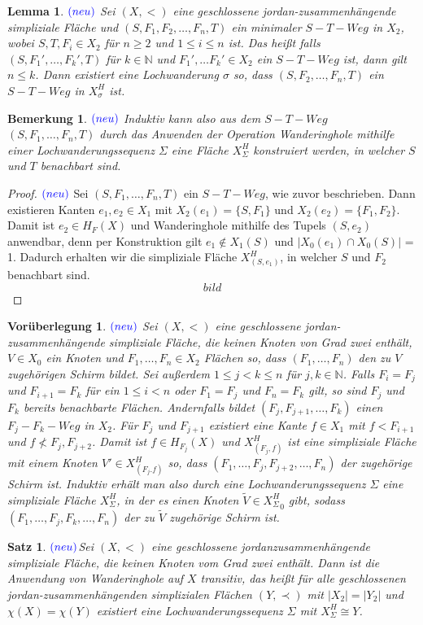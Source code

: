 \documentclass[12pt,titlepage]{article}
\newtheorem{vor}{Vorüberlegung}[section]
\newtheorem{lemma}{Lemma}
\newtheorem{bemerkung}{Bemerkung}[section]
\newtheorem{satz}{Satz}[section]
\begin{document}
\begin{lemma} \label{lemma2} $\textcolor{blue}{(neu)}$ 
Sei $(X,<)$ eine geschlossene jordan-zusammenhängende simpliziale Fläche und $(S,F_1,F_2,\ldots,F_n,T)$ ein minimaler $S-T-Weg$ in $X_2$, wobei $S,T,F_i \in X_2$ für $n \geq 2$ und $1 \leq i \leq n$ ist.
 Das heißt falls $(S,F_1',\ldots,F_k',T)$ für $k \in \mathbb{N}$ und $F_1',\ldots F_k'\in X_2$ ein $S-T-Weg$ ist, dann gilt $n \leq k$. 
Dann existiert eine Lochwanderung $\sigma$ so, dass $(S,F_2, \ldots,F_n,T)$ ein $S-T-Weg$ in $X^H_{\sigma}$ ist.
\end{lemma}
\begin{bemerkung} $\textcolor{blue}{(neu)}$
Induktiv kann also aus dem $S-T-Weg$ $(S,F_1,\ldots,F_n,T)$ durch das Anwenden der Operation Wanderinghole mithilfe einer Lochwanderungssequenz $\Sigma$ eine Fläche $X^H_{\Sigma}$ konstruiert werden, in welcher $S$ und $T$ benachbart sind.
\end{bemerkung}
\begin{proof} $\textcolor{blue}{(neu)}$
Sei $(S,F_1,\ldots,F_n,T)$ ein $S-T-Weg$, wie  zuvor beschrieben. Dann existieren Kanten $e_1,e_2 \in X_1$ mit $X_2(e_1)= \{S,F_1\}$ und $X_2(e_2)=\{F_1,F_2\}$. Damit ist $e_2 \in H_F(X)$ und Wanderinghole mithilfe des Tupels $(S,e_2)$ anwendbar, denn per Konstruktion gilt $e_1 \notin X_1(S) $ und $\vert X_0(e_1) \cap X_0(S)\vert$ = 1. Dadurch erhalten wir die simpliziale Fläche $X^H_{(S,e_1)}$, in welcher $S$ und $F_2$ benachbart sind.
\[
bild
\]
\end{proof}

\begin{vor} \label{vor2} $\textcolor{blue}{(neu)}$ 
Sei $(X,<)$ eine geschlossene jordan-zusammenhängende simpliziale Fläche, die keinen Knoten von Grad zwei enthält, $V\in X_0$ ein Knoten und $F_1,\ldots,F_n \in X_2$ Flächen so, dass $(F_1,\ldots,F_n)$ den zu $V$ zugehörigen Schirm bildet. Sei außerdem $1 \leq j<k\leq n$ für $j,k \in \mathbb{N}$. Falls $F_i=F_j$ und $F_{i+1}=F_k$ für ein $1 \leq i < n$ oder $F_1=F_j$ und $F_n=F_k$ gilt, so sind $F_j$ und $F_k$ bereits benachbarte Flächen. Andernfalls bildet $(F_j,F_{j+1},\ldots,F_k)$ einen $F_j-F_k-Weg$ in $X_2$. Für $F_j$ und $F_{j+1}$ existiert eine Kante $f \in X_1$ mit $f<F_{i+1}$ und $f \nless F_j,F_{j+2}$. Damit ist $f \in H_{F_j}(X)$ und $X^H_{(F_j,f)}$ ist eine simpliziale Fläche mit einem Knoten $V'\in X^H_{(F_j.f)}$ so, dass $(F_1,\ldots,F_j,F_{j+2},\ldots,F_n)$ der zugehörige Schirm ist. Induktiv erhält man also durch eine Lochwanderungssequenz $\Sigma$ eine simpliziale Fläche $X_{\Sigma}^H$, in der es einen Knoten $\tilde{V} \in {X_{\Sigma}^H}_0$ gibt, sodass $(F_1,\ldots,F_j,F_k,\ldots,F_n)$ der zu $\tilde{V}$ zugehörige Schirm ist. 
\end{vor}
\begin{satz}$\textcolor{blue}{(neu)}$\label{WH}
Sei $(X,<)$ eine geschlossene jordanzusammenhängende simpliziale Fläche, die keinen Knoten vom Grad zwei enthält. Dann ist die Anwendung von Wanderinghole auf $X$ transitiv, das heißt für alle geschlossenen jordan-zusammenhängenden simplizialen Flächen $(Y,\prec)$ mit $\vert X_2 \vert = \vert Y_2 \vert$ und $\chi(X)=\chi(Y)$ existiert eine Lochwanderungssequenz $\Sigma$ mit $X^H_{\Sigma} \cong Y$.
\end{satz}
\end{document}
